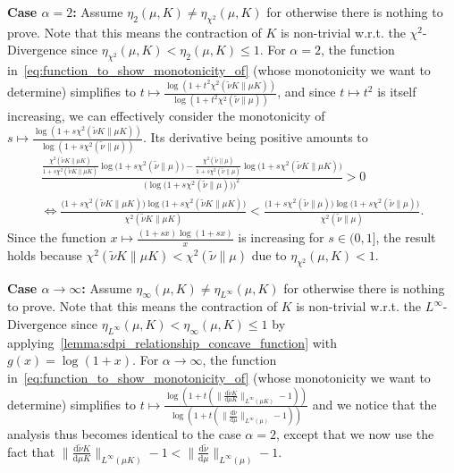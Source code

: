 \documentclass[conference,letterpaper]{IEEEtran}
\newcommand{\dd}[1]{\mathrm{d}#1}
\begin{document}
\begin{IEEEproof}
    \textbf{Case $\alpha=2$:} Assume $\eta_2(\mu, K)\neq\eta_{\chi^2}(\mu, K)$ for otherwise there is nothing to prove. Note that this means the contraction of $K$ is non-trivial w.r.t. the $\chi^2$-Divergence since $\eta_{\chi^2}(\mu, K)<\eta_2(\mu, K)\leq1$. For $\alpha=2$, the function in~\cref{eq:function_to_show_monotonicity_of} (whose monotonicity we want to determine) simplifies to ${t\mapsto\frac{\log(1+t^2\chi^2(\tilde{\nu}K\|\mu K))}{\log(1+t^2\chi^2(\tilde{\nu}\|\mu))}}$, and since $t\mapsto t^2$ is itself increasing, we can effectively consider the monotonicity of $s\mapsto\frac{\log(1+s\chi^2(\tilde{\nu}K\|\mu K))}{\log(1+s\chi^2(\tilde{\nu}\|\mu))}$. Its derivative being positive amounts to
    \begin{align*}
        \frac{\frac{\chi^2(\tilde{\nu} K\|\mu K)}{1+s\chi^2(\tilde{\nu} K\|\mu K)}\log\big(1+s\chi^2(\tilde{\nu}\|\mu)\big) - \frac{\chi^2(\tilde{\nu}\|\mu)}{1+s\chi^2(\tilde{\nu}\|\mu)}\log\big(1+s\chi^2(\tilde{\nu} K\|\mu K)\big)}{\Big(\log\big(1+s\chi^2(\tilde{\nu}\|\mu)\big) \Big)^2} > 0\\
        \iff  \frac{\big(1+s\chi^2(\tilde{\nu} K\|\mu K)\big)\log\big(1+s\chi^2(\tilde{\nu} K\|\mu K)\big)}{\chi^2(\tilde{\nu} K\|\mu K)}< \frac{\big(1+s\chi^2(\tilde{\nu}\|\mu)\big)\log\big(1+s\chi^2(\tilde{\nu}\|\mu)\big)}{\chi^2(\tilde{\nu}\|\mu)}.
    \end{align*}
    Since the function $x\mapsto \frac{(1+sx)\log(1+sx)}{x}$ is increasing for $s\in(0, 1]$, the result holds because $\chi^2(\tilde{\nu} K\|\mu K)<\chi^2(\tilde{\nu}\|\mu)$ due to $\eta_{\chi^2}(\mu, K)<1$.

    \textbf{Case $\alpha\to\infty$:} Assume $\eta_\infty(\mu, K)\neq\eta_{L^\infty}(\mu, K)$ for otherwise there is nothing to prove. Note that this means the contraction of $K$ is non-trivial w.r.t. the $L^\infty$-Divergence since $\eta_{L^\infty}(\mu, K)<\eta_\infty(\mu, K)\leq1$ by applying~\cref{lemma:sdpi_relationship_concave_function} with ${g(x)=\log(1+x)}$. For $\alpha\to\infty$, the function in~\cref{eq:function_to_show_monotonicity_of} (whose monotonicity we want to determine) simplifies to $t\mapsto\frac{\log\left(1+t\left(\|\frac{\dd\tilde{\nu}K}{\dd\mu K}\|_{L^\infty(\mu K)}-1\right)\right)}{\log\left(1+t\left(\|\frac{\dd\tilde{\nu}}{\dd\mu}\|_{L^\infty(\mu)}-1\right)\right)}$ and we notice that the analysis thus becomes identical to the case $\alpha=2$, except that we now use the fact that ${\|\frac{\dd\tilde{\nu }K}{\dd\mu K}\|_{L^\infty(\mu K)}-1<\|\frac{\dd\tilde{\nu}}{\dd\mu}\|_{L^\infty(\mu)}-1}$.
    \end{IEEEproof}
\end{document}
